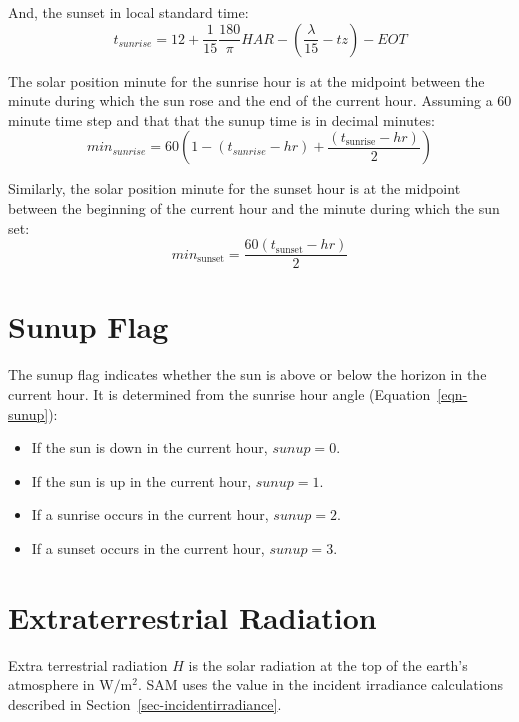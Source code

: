 \documentclass[12pt,letterpaper]{article}
\begin{document}
And, the sunset in local standard time: 
\begin{equation}
t_{sunrise} = 12 + \frac{1}{15} \frac{180}{\pi}\mathit{HAR} - \left(\frac{\lambda}{15} - \mathit{tz}\right)-\mathit{EOT}
\end{equation}

The solar position minute for the sunrise hour is at the midpoint between the minute during which the sun rose and the end of the current hour. Assuming a 60 minute time step and that that the sunup time is in decimal minutes: 
\begin{equation}
\mathit{min}_{sunrise}=60 \left(1 - (t_{sunrise} -\mathit{hr}) + \frac{(t_{\mathrm{sunrise}} - hr)}{2}\right)
\end{equation}

Similarly, the solar position minute for the sunset hour is at the midpoint between the beginning of the current hour and the minute during which the sun set:
\begin{equation}
\mathit{min}_{\mathrm{sunset}}=\frac{60 (t_{\mathrm{sunset}} - \mathit{hr})}{2}
\end{equation}

\section{Sunup Flag}\label{sec-sunup}

The sunup flag indicates whether the sun is above or below the horizon in the current hour. It is determined from the sunrise hour angle (Equation~\ref{eqn-sunup}):
  \begin{itemize}
  \item If the sun is down in the current hour, $\mathit{sunup} = 0$.
  \item If the sun is up in the current hour, $\mathit{sunup} = 1$.
  \item If a sunrise occurs in the current hour, $\mathit{sunup} = 2$.
  \item If a sunset occurs in the current hour, $\mathit{sunup} = 3$.
  \end{itemize}


\section{Extraterrestrial Radiation}\label{sec-hextra}

Extra terrestrial radiation $H$ is the solar radiation at the top of the earth's atmosphere in $\mathrm{W/m^2}$. SAM uses the value in the incident irradiance calculations described in Section~\ref{sec-incidentirradiance}.
 
\end{document}
